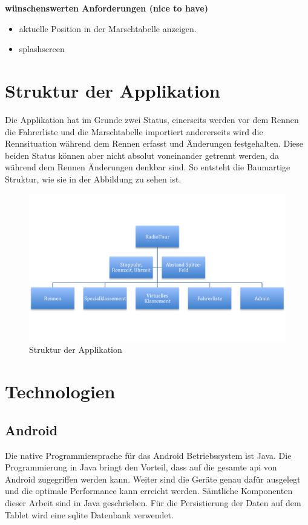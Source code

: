 \textbf{wünschenswerten Anforderungen (nice to have)}
\begin{itemize}
\item aktuelle Position in der Marschtabelle anzeigen.
\item \gls{splashscreen}
\end{itemize}


\section{Struktur der Applikation}
Die Applikation hat im Grunde zwei Status, einerseits werden vor dem Rennen die Fahrerliste und die Marschtabelle importiert andererseits wird die Rennsituation während dem Rennen erfasst und Änderungen festgehalten. Diese beiden Status können aber nicht absolut voneinander getrennt werden, da während dem Rennen Änderungen denkbar sind. So entsteht die Baumartige Struktur, wie sie in der Abbildung zu sehen ist.

\begin{figure}[h!]
\caption{Struktur der Applikation}
\centering
\includegraphics{05bericht/images/struktur.png}
\end{figure} 



\section{Technologien}
\subsection{Android}
Die native Programmiersprache für das Android Betriebssystem ist Java. Die Programmierung in Java bringt den Vorteil, dass auf die gesamte \gls{api} von Android zugegriffen werden kann. Weiter sind die Geräte genau dafür ausgelegt und die optimale Performance kann erreicht werden. Sämtliche Komponenten dieser Arbeit sind in Java geschrieben. Für die Persistierung der Daten auf dem Tablet wird eine \gls{sqlite} Datenbank verwendet.

